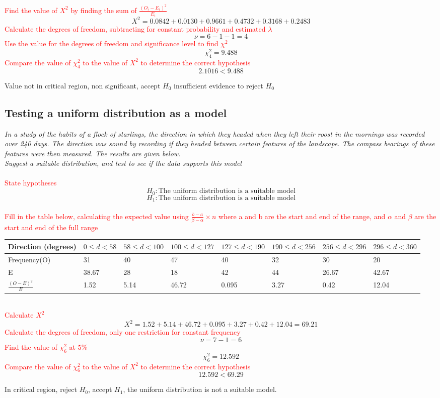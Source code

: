 \documentclass{article}[18pt]
\begin{document}
\textcolor{red}{Find the value of $X^2$ by finding the sum of $\frac{(O_i-E_i)^2}{E_i}$}
$$X^2=0.0842+0.0130+0.9661+0.4732+0.3168+0.2483$$
\textcolor{red}{Calculate the degrees of freedom, subtracting for constant probability and estimated $\lambda$}
$$\nu=6-1-1=4$$
\textcolor{red}{Use the value for the degrees of freedom and significance level to find $\chi^2$}
$$\chi^2_4=9.488$$
\textcolor{red}{Compare the value of $\chi_4^2$ to the value of $X^2$ to determine the correct hypothesis}
$$2.1016<9.488$$
\begin{center}
Value not in critical region, non significant, accept $H_0$ insufficient evidence to reject $H_0$
\end{center}
\newpage
\subsection{Testing a uniform distribution as a model}
\textit{In a study of the habits of a flock of starlings, the direction in which they headed when they left their roost in the mornings was recorded over 240 days. The direction was sound by recording if they headed between certain features of the landscape. The compass bearings of these features were then measured. The results are given below.\\
Suggest a suitable distribution, and test to see if the data supports this model}\\
\\
\textcolor{red}{State hypotheses}
$$H_0:\textrm{The uniform distribution is a suitable model}$$
$$H_1:\textrm{The uniform distribution is a suitable model}$$
\\
\textcolor{red}{Fill in the table below, calculating the expected value using $\frac{b-a}{\beta-\alpha}\times n$ where a and b are the start and end of the range, and $\alpha$ and $\beta$ are the start and end of the full range}\\
\begin{tabularx}{\textwidth}{|X|X|X|X|X|X|X|X|}
\hline
Direction (degrees)&$0\leqslant d<58$&$58\leqslant d<100$&$100\leqslant d<127$&$127\leqslant d<190$&$190\leqslant d<256$&$256\leqslant d<296$&$296\leqslant d<360$\\
\hline
Frequency(O)&31&40&47&40&32&30&20\\
\hline
E&38.67&28&18&42&44&26.67&42.67\\
\hline
$\frac{(O-E)^2}{E}$&1.52&5.14&46.72&0.095&3.27&0.42&12.04\\
\hline
\end{tabularx}\\
\textcolor{red}{Calculate $X^2$}
$$X^2=1.52+5.14+46.72+0.095+3.27+0.42+12.04=69.21$$
\textcolor{red}{Calculate the degrees of freedom, only one restriction for constant frequency}
$$\nu=7-1=6$$
\textcolor{red}{Find the value of $\chi^2_6$ at 5\%}
$$\chi^2_6=12.592$$
\textcolor{red}{Compare the value of $\chi^2_6$ to the value of $X^2$ to determine the correct hypothesis}
$$12.592<69.29$$
\begin{center}
In critical region, reject $H_0$, accept $H_1$, the uniform distribution is not a suitable model.
\end{center}
\newpage
\end{document}
